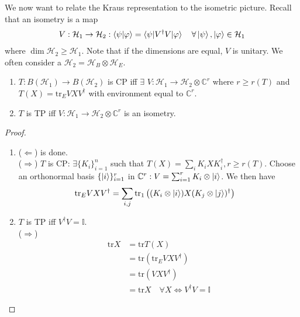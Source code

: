 \documentclass[../../note.tex]{subfiles}
\begin{document}
We now want to relate the Kraus representation to the isometric picture. Recall that an isometry is a map
\begin{align}
    V: \mathcal{H}_1 \rightarrow \mathcal{H}_2 : \braket{\psi|\varphi} = \braket{\psi|V^{\dagger}V|\varphi} \quad \forall \ket{\psi}, \ket{\varphi} \in \mathcal{H}_1
\end{align}
where $\dim \mathcal{H}_2 \geq \mathcal{H}_1$. Note that if the dimensions are equal, $V$ is unitary. We often consider a $\mathcal{H}_2 = \mathcal{H}_B \otimes \mathcal{H}_E$. 

\begin{proposition}
\begin{enumerate}
    \item $T: B(\mathcal{H}_1)\rightarrow B(\mathcal{H}_2)$  is CP iff $\exists$ $V: \mathcal{H}_1 \rightarrow \mathcal{H}_2 \otimes \mathbb{C}^r$ where $r \geq r(T)$ and $T(X) =\text{tr}_E VXV^{\dagger}$ with environment equal to $\mathbb{C}^r$.
    \item $T$ is TP iff $V: \mathcal{H}_1\rightarrow \mathcal{H}_2 \otimes \mathbb{C}^r$ is an isometry.
\end{enumerate}
\end{proposition}

\begin{tcolorbox}[colframe=black,breakable, colback=black!5, arc=0pt, outer arc=0pt,boxrule=0.5pt]
\begin{proof}
\begin{enumerate}
    \item ($\Leftarrow$) is done. \\
    ($\Rightarrow$) $T$ is CP: $\exists \{K_i\}_{i=1}^n$ such that $T(X) = \sum_i K_i X K_i^{\dagger}, r \geq r(T)$. Choose an orthonormal basis $\{\ket{i}\}_{i=1}^r$ in $\mathbb{C}^r: V=\sum_{i=1}^r K_i \otimes \ket{i}$. We then have 
    \begin{align}
        \text{tr}_E VXV^{\dagger} &= \sum_{i,j}\text{tr}_1 \left((K_i \otimes \ket{i})X(K_j \otimes \ket{j})^{\dagger}\right)
    \end{align}
    
    \item $T$ is TP iff $V^{\dagger}V=\mathbb{I}$. \\
    ($\Rightarrow$) 
    \begin{align}
         \text{tr}X &= \text{tr}T(X) \\
         &= \text{tr}\left(\text{tr}_E VXV^{\dagger}\right) \\
         &= \text{tr}(VXV^{\dagger})\\
         &=\text{tr} X \quad \forall X \Leftrightarrow V^{\dagger}V=\mathbb{I}
    \end{align}
\end{enumerate}
\end{proof}
\end{tcolorbox}
\end{document}
